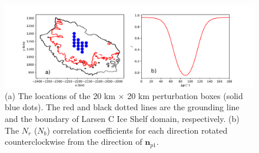 \documentclass[tc, manuscript]{copernicus}
\begin{document}

\begin{figure}
	\centering
    \includegraphics[width=1\linewidth]{./figs/larsenc_r2_all_direction_less.pdf}
    \caption{(a) The locations of the 20 km $\times$ 20 km perturbation boxes (solid blue dots). The red and black dotted lines are the grounding line and the boundary of Larsen C Ice Shelf domain, respectively. (b)  The $N_r$ ($N_b$) correlation coefficients for each direction rotated counterclockwise from the direction of $\mathbf{n}_{p1}$.}
	\label{larsenc_r2_all_direction_less}
\end{figure}
\end{document}
